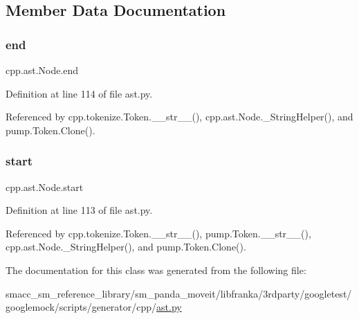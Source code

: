\subsection{Member Data Documentation}
\mbox{\label{classcpp_1_1ast_1_1Node_a3c5e5246ccf619df28eca02e29d69647}} 
\subsubsection{\texorpdfstring{end}{end}}
{\footnotesize\ttfamily cpp.\+ast.\+Node.\+end}



Definition at line 114 of file ast.\+py.



Referenced by cpp.\+tokenize.\+Token.\+\_\+\+\_\+str\+\_\+\+\_\+(), cpp.\+ast.\+Node.\+\_\+\+String\+Helper(), and pump.\+Token.\+Clone().

\mbox{\label{classcpp_1_1ast_1_1Node_a7b2aa97e6a049bb1a93aea48c48f1f44}} 
\subsubsection{\texorpdfstring{start}{start}}
{\footnotesize\ttfamily cpp.\+ast.\+Node.\+start}



Definition at line 113 of file ast.\+py.



Referenced by cpp.\+tokenize.\+Token.\+\_\+\+\_\+str\+\_\+\+\_\+(), pump.\+Token.\+\_\+\+\_\+str\+\_\+\+\_\+(), cpp.\+ast.\+Node.\+\_\+\+String\+Helper(), and pump.\+Token.\+Clone().



The documentation for this class was generated from the following file\+:\begin{DoxyCompactItemize}
\item 
smacc\+\_\+sm\+\_\+reference\+\_\+library/sm\+\_\+panda\+\_\+moveit/libfranka/3rdparty/googletest/googlemock/scripts/generator/cpp/\hyperlink{ast_8py}{ast.\+py}\end{DoxyCompactItemize}
